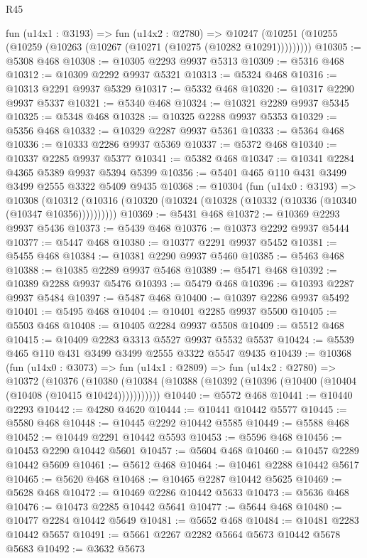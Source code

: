\begin{lexlean}{R45}
\begin{coremodule}
    fun (u14x1 : @3193) =>
    fun (u14x2 : @2780) =>
    @10247 (@10251 (@10255 (@10259 (@10263 (@10267 (@10271 (@10275 (@10282 @10291)))))))))
@10305 := @5308 @468
@10308 := @10305 @2293 @9937 @5313
@10309 := @5316 @468
@10312 := @10309 @2292 @9937 @5321
@10313 := @5324 @468
@10316 := @10313 @2291 @9937 @5329
@10317 := @5332 @468
@10320 := @10317 @2290 @9937 @5337
@10321 := @5340 @468
@10324 := @10321 @2289 @9937 @5345
@10325 := @5348 @468
@10328 := @10325 @2288 @9937 @5353
@10329 := @5356 @468
@10332 := @10329 @2287 @9937 @5361
@10333 := @5364 @468
@10336 := @10333 @2286 @9937 @5369
@10337 := @5372 @468
@10340 := @10337 @2285 @9937 @5377
@10341 := @5382 @468
@10347 := @10341 @2284 @4365 @5389 @9937 @5394 @5399
@10356 := @5401 @465 @110 @431 @3499 @3499 @2555 @3322 @5409 @9435
@10368 := @10304
    (fun (u14x0 : @3193) =>
    @10308 (@10312 (@10316 (@10320 (@10324 (@10328 (@10332 (@10336 (@10340 (@10347 @10356))))))))))
@10369 := @5431 @468
@10372 := @10369 @2293 @9937 @5436
@10373 := @5439 @468
@10376 := @10373 @2292 @9937 @5444
@10377 := @5447 @468
@10380 := @10377 @2291 @9937 @5452
@10381 := @5455 @468
@10384 := @10381 @2290 @9937 @5460
@10385 := @5463 @468
@10388 := @10385 @2289 @9937 @5468
@10389 := @5471 @468
@10392 := @10389 @2288 @9937 @5476
@10393 := @5479 @468
@10396 := @10393 @2287 @9937 @5484
@10397 := @5487 @468
@10400 := @10397 @2286 @9937 @5492
@10401 := @5495 @468
@10404 := @10401 @2285 @9937 @5500
@10405 := @5503 @468
@10408 := @10405 @2284 @9937 @5508
@10409 := @5512 @468
@10415 := @10409 @2283 @3313 @5527 @9937 @5532 @5537
@10424 := @5539 @465 @110 @431 @3499 @3499 @2555 @3322 @5547 @9435
@10439 := @10368
    (fun (u14x0 : @3073) =>
    fun (u14x1 : @2809) =>
    fun (u14x2 : @2780) =>
    @10372
      (@10376
        (@10380 (@10384 (@10388 (@10392 (@10396 (@10400 (@10404 (@10408 (@10415 @10424)))))))))))
@10440 := @5572 @468
@10441 := @10440 @2293
@10442 := @4280 @4620
@10444 := @10441 @10442 @5577
@10445 := @5580 @468
@10448 := @10445 @2292 @10442 @5585
@10449 := @5588 @468
@10452 := @10449 @2291 @10442 @5593
@10453 := @5596 @468
@10456 := @10453 @2290 @10442 @5601
@10457 := @5604 @468
@10460 := @10457 @2289 @10442 @5609
@10461 := @5612 @468
@10464 := @10461 @2288 @10442 @5617
@10465 := @5620 @468
@10468 := @10465 @2287 @10442 @5625
@10469 := @5628 @468
@10472 := @10469 @2286 @10442 @5633
@10473 := @5636 @468
@10476 := @10473 @2285 @10442 @5641
@10477 := @5644 @468
@10480 := @10477 @2284 @10442 @5649
@10481 := @5652 @468
@10484 := @10481 @2283 @10442 @5657
@10491 := @5661 @2267 @2282 @5664 @5673 @10442 @5678 @5683
@10492 := @3632 @5673

\end{coremodule}
\end{lexlean}
